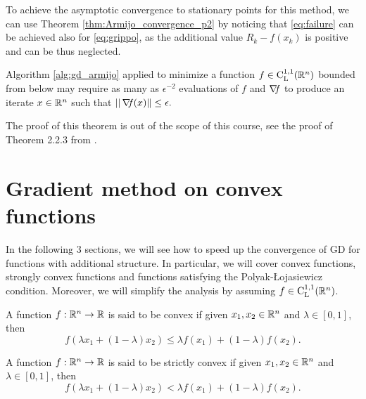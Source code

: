 \documentclass[10pt,a4paper]{article}
\begin{document}
To achieve the asymptotic convergence to stationary points for this method, we can use Theorem \ref{thm:Armijo_convergence_p2} by noticing that \eqref{eq:failure} can be achieved also for \eqref{eq:grippo}, as the additional value $R_k-f(x_k)$ is positive and can be thus neglected.

\begin{theorem}
	Algorithm \ref{alg:gd_armijo} applied to minimize a function $f\in \mathord{\mathrm{C^{1,1}_{L}}}(\mathbb{R}^n)$ bounded from below may require as many as $\epsilon^{-2}$ evaluations of $f$ and $\operatorname*{\mathit{\nabla \!f}}$ to produce an iterate $x\in \mathbb{R}^n$ such that $||\operatorname*{\mathit{\nabla \!f}} (x)\|\leq \epsilon.$
\end{theorem}
\noindent The proof of this theorem is out of the scope of this course, see the proof of Theorem 2.2.3 from \cite{cartis22a}.

\section{Gradient method on convex functions}
In the following 3 sections, we will see how to speed up the convergence of GD for functions with additional structure. In particular, we will cover convex functions, strongly convex functions and functions satisfying the Polyak-\L ojasiewicz condition. Moreover, we will simplify the analysis by assuming $f\in \mathord{\mathrm{C^{1,1}_{L}}}(\mathbb{R}^n)$.
\begin{definition}
	A function $f:\mathbb{R}^n\to \mathbb{R}$ is said to be convex if given $x_1,x_2\in \mathbb{R}^n$ and $\lambda\in [0,1]$, then 
	\begin{equation*}
		f(\lambda x_1 +(1-\lambda) x_2) \leq \lambda f(x_1) +(1-\lambda) f(x_2).
	\end{equation*}
\end{definition}
\begin{definition}
	A function $f:\mathbb{R}^n\to \mathbb{R}$ is said to be strictly convex if given $x_1,x_2\in \mathbb{R}^n$ and $\lambda\in [0,1]$, then 
	\begin{equation*}
		f(\lambda x_1 +(1-\lambda) x_2) < \lambda f(x_1) +(1-\lambda) f(x_2).
	\end{equation*}
\end{definition}
\end{document}
